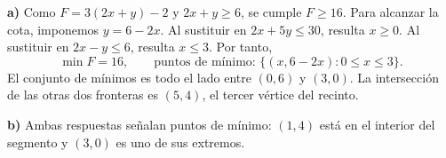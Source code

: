 \textbf{a)} Como $F=3(2x+y)-2$ y $2x+y\ge6$, se cumple $F\ge16$. Para alcanzar la cota, imponemos $y=6-2x$. Al sustituir en $2x+5y\le30$, resulta $x\ge0$. Al sustituir en $2x-y\le6$, resulta $x\le3$. Por tanto,
\[
\min F=\boxed{16},\qquad
\text{puntos de mínimo: }\boxed{\{(x,6-2x):0\le x\le3\}}.
\]
El conjunto de mínimos es todo el lado entre $(0,6)$ y $(3,0)$. La intersección de las otras dos fronteras es $(5,4)$, el tercer vértice del recinto.

\textbf{b)} Ambas respuestas señalan puntos de mínimo: $(1,4)$ está en el interior del segmento y $(3,0)$ es uno de sus extremos.
